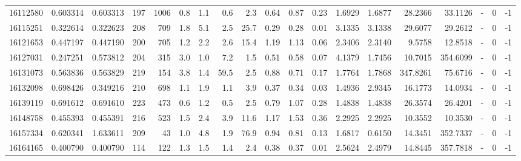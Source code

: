 \begin{tabular}{rrrrrrrrrrrrrrrrlrr}
  16112580 & 0.603314 &   0.603313 &  197 & 1006 &      0.8 &      1.1 &     0.6 &      2.3 &       0.64 &        0.87 &        0.23 &  1.6929 &  1.6877 &   28.2366 &   33.1126 &             - &        0 &         -1 \\
  16115251 & 0.322614 &   0.322623 &  208 &  709 &      1.8 &      5.1 &     2.5 &     25.7 &       0.29 &        0.28 &        0.01 &  3.1335 &  3.1338 &   29.6077 &   29.2612 &             - &        0 &         -1 \\
  16121653 & 0.447197 &   0.447190 &  200 &  705 &      1.2 &      2.2 &     2.6 &     15.4 &       1.19 &        1.13 &        0.06 &  2.3406 &  2.3140 &    9.5758 &   12.8518 &             - &        0 &         -1 \\
  16127031 & 0.247251 &   0.573812 &  204 &  315 &      3.0 &      1.0 &     7.2 &      1.5 &       0.51 &        0.58 &        0.07 &  4.1379 &  1.7456 &   10.7015 &  354.6099 &             - &        0 &         -1 \\
  16131073 & 0.563836 &   0.563829 &  219 &  154 &      3.8 &      1.4 &    59.5 &      2.5 &       0.88 &        0.71 &        0.17 &  1.7764 &  1.7868 &  347.8261 &   75.6716 &             - &        0 &         -1 \\
  16132098 & 0.698426 &   0.349216 &  210 &  698 &      1.1 &      1.9 &     1.1 &      3.9 &       0.37 &        0.34 &        0.03 &  1.4936 &  2.9345 &   16.1773 &   14.0934 &             - &        0 &         -1 \\
  16139119 & 0.691612 &   0.691610 &  223 &  473 &      0.6 &      1.2 &     0.5 &      2.5 &       0.79 &        1.07 &        0.28 &  1.4838 &  1.4838 &   26.3574 &   26.4201 &             - &        0 &         -1 \\
  16148758 & 0.455393 &   0.455391 &  216 &  523 &      1.5 &      2.4 &     3.9 &     11.6 &       1.17 &        1.53 &        0.36 &  2.2925 &  2.2925 &   10.3552 &   10.3530 &             - &        0 &         -1 \\
  16157334 & 0.620341 &   1.633611 &  209 &   43 &      1.0 &      4.8 &     1.9 &     76.9 &       0.94 &        0.81 &        0.13 &  1.6817 &  0.6150 &   14.3451 &  352.7337 &             - &        0 &         -1 \\
  16164165 & 0.400790 &   0.400790 &  114 &  122 &      1.3 &      1.5 &     1.4 &      2.4 &       0.38 &        0.37 &        0.01 &  2.5624 &  2.4979 &   14.8445 &  357.7818 &             - &        0 &         -1 \\

\end{tabular}
